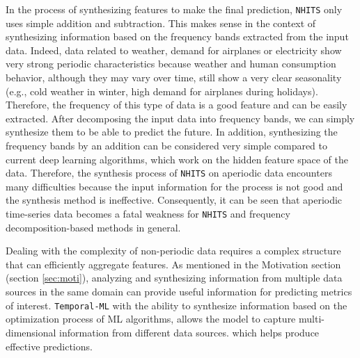 In the process of synthesizing features to make the final prediction, \verb|NHITS| only uses simple addition and subtraction. This makes sense in the context of synthesizing information based on the frequency bands extracted from the input data. Indeed, data related to weather, demand for airplanes or electricity show very strong periodic characteristics because weather and human consumption behavior, although they may vary over time, still show a very clear seasonality (e.g., cold weather in winter, high demand for airplanes during holidays). Therefore, the frequency of this type of data is a good feature and can be easily extracted. After decomposing the input data into frequency bands, we can simply synthesize them to be able to predict the future. In addition, synthesizing the frequency bands by an addition can be considered very simple compared to current deep learning algorithms, which work on the hidden feature space of the data. Therefore, the synthesis process of \verb|NHITS| on aperiodic data encounters many difficulties because the input information for the process is not good and the synthesis method is ineffective. Consequently, it can be seen that aperiodic time-series data becomes a fatal weakness for \verb|NHITS| and frequency decomposition-based methods in general.


Dealing with the complexity of non-periodic data requires a complex structure that can efficiently aggregate features. As mentioned in the Motivation section (section \ref{sec:moti}), analyzing and synthesizing information from multiple data sources in the same domain can provide useful information for predicting metrics of interest. \verb|Temporal-ML| with the ability to synthesize information based on the optimization process of ML algorithms, allows the model to capture multi-dimensional information from different data sources. which helps produce effective predictions.

